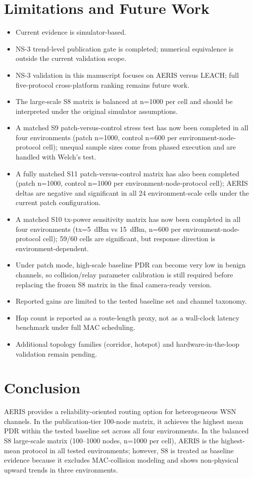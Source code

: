 ﻿\documentclass[sensors,article,submit,moreauthors,pdftex]{Definitions/mdpi}
\begin{document}
\section{Limitations and Future Work}
\begin{itemize}
\item Current evidence is simulator-based.
\item NS-3 trend-level publication gate is completed; numerical equivalence is outside the current validation scope.
\item NS-3 validation in this manuscript focuses on AERIS versus LEACH; full five-protocol cross-platform ranking remains future work.
\item The large-scale S8 matrix is balanced at n=1000 per cell and should be interpreted under the original simulator assumptions.
\item A matched S9 patch-versus-control stress test has now been completed in all four environments (patch n=1000, control n=600 per environment-node-protocol cell); unequal sample sizes come from phased execution and are handled with Welch's test.
\item A fully matched S11 patch-versus-control matrix has also been completed (patch n=1000, control n=1000 per environment-node-protocol cell); AERIS deltas are negative and significant in all 24 environment-scale cells under the current patch configuration.
\item A matched S10 tx-power sensitivity matrix has now been completed in all four environments (tx=\SI{5}{dBm} vs \SI{15}{dBm}, n=600 per environment-node-protocol cell); 59/60 cells are significant, but response direction is environment-dependent.
\item Under patch mode, high-scale baseline PDR can become very low in benign channels, so collision/relay parameter calibration is still required before replacing the frozen S8 matrix in the final camera-ready version.
\item Reported gains are limited to the tested baseline set and channel taxonomy.
\item Hop count is reported as a route-length proxy, not as a wall-clock latency benchmark under full MAC scheduling.
\item Additional topology families (corridor, hotspot) and hardware-in-the-loop validation remain pending.
\end{itemize}

\section{Conclusion}
AERIS provides a reliability-oriented routing option for heterogeneous WSN channels. In the publication-tier 100-node matrix, it achieves the highest mean PDR within the tested baseline set across all four environments. In the balanced S8 large-scale matrix (100--1000 nodes, n=1000 per cell), AERIS is the highest-mean protocol in all tested environments; however, S8 is treated as baseline evidence because it excludes MAC-collision modeling and shows non-physical upward trends in three environments.
\end{document}
